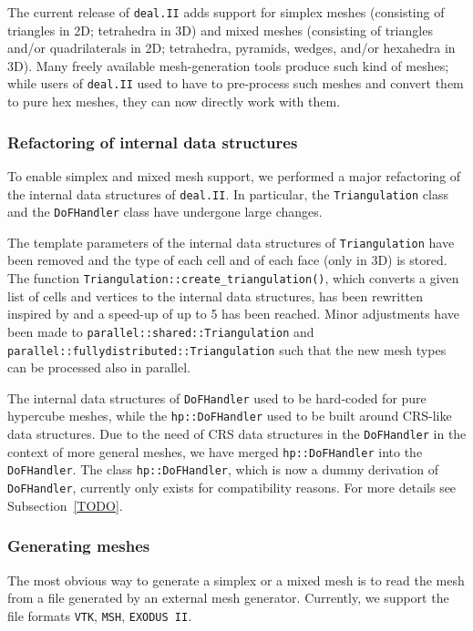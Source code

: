 \documentclass{ansarticle-preprint}
\newcommand{\specialword}[1]{\texttt{#1}}
\newcommand{\dealii}{{\specialword{deal.II}}\xspace}
\begin{document}
The current release of \dealii adds support for simplex meshes (consisting of triangles in 2D; tetrahedra in 3D) and mixed meshes (consisting of triangles and/or
quadrilaterals in 2D; tetrahedra, pyramids, wedges, and/or hexahedra in 3D).
Many freely available mesh-generation tools produce such kind of meshes; while users of \dealii used to have to pre-process such meshes and convert them to pure hex meshes, they
can now directly work with them.

\subsubsection{Refactoring of internal data structures}

To enable simplex and mixed mesh support, we performed a major refactoring of the internal data structures of \dealii. In particular, the \texttt{Triangulation} class and
the \texttt{DoFHandler} class have undergone large changes.

The template parameters of the internal data structures of \texttt{Triangulation}
have been removed and the type of each cell and of each face (only in 3D) is stored. The function
\texttt{Triangulation::create\_\allowbreak triangulation()}, which converts a given list of
cells and vertices to the internal data structures, has been rewritten
inspired by \citep{logg09} and a speed-up of up to 5 has been reached. Minor adjustments
have been made to \texttt{parallel::shared::Triangulation} and \texttt{parallel::\allowbreak fullydistributed::\allowbreak Triangulation} such that
the new mesh types can be processed also in parallel.

The internal data structures of \texttt{DoFHandler} used to be hard-coded for pure
hypercube meshes, while the \texttt{hp::DoFHandler} used to be built around
CRS-like data structures. Due to the need of CRS data structures in the
\texttt{DoFHandler} in the context of more general meshes, we have merged
\texttt{hp::DoFHandler} into the \texttt{DoFHandler}. The class \texttt{hp::DoFHandler}, which is now a dummy derivation of \texttt{DoFHandler}, currently only exists for compatibility reasons. For
more details see Subsection~\ref{TODO}.

\subsubsection{Generating meshes}

The most obvious way to generate a simplex or a mixed mesh is to read the mesh from a file
generated by an external mesh generator. Currently, we support the
file formats \texttt{VTK}, \texttt{MSH}, \texttt{EXODUS II}.
\end{document}
